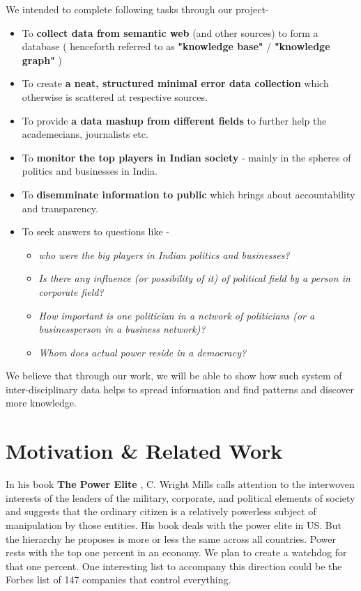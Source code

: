 We intended to complete following tasks through our project-
\begin{itemize}

    \item To \textbf{collect data from semantic web} (and other sources) to form a database ( henceforth referred to as \textbf{"knowledge base"} / \textbf{"knowledge graph"} )
    \item To create \textbf{ a neat, structured minimal error data collection } which otherwise is scattered at respective sources.
    \item To provide \textbf{ a data mashup from different fields } to further help the academecians, journalists etc.
    \item To \textbf{ monitor the top players in Indian society } - mainly in the spheres of politics and businesses in India.
    \item To \textbf{ disemminate information to public }  which brings about accountability and transparency. 
    \item  To seek answers to questions like -
        \begin{itemize}
         \item \emph{ who were the big players in Indian politics and businesses? }
         \item \emph{ Is there any influence (or possibility of it) of political field by a person in corporate field? }
         \item \emph{ How important is one politician in a network of politicians (or a businessperson in a business network)? }
         \item \emph{ Whom does actual power reside in a democracy? }
        \end{itemize}
\end{itemize}
We believe that through our work, we will be able to show how such system of inter-disciplinary data helps to spread information and find patterns and discover more knowledge.

\section{Motivation \& Related Work}

In his book \textbf{The Power Elite} \cite{Mills}, C. Wright Mills calls attention to the interwoven interests of the leaders of the military, corporate, and political elements of society and suggests that the ordinary citizen is a relatively powerless subject of manipulation by those entities. His book deals with the power elite in US. But the hierarchy he proposes is more or less the same across all countries. Power rests with the top one percent in an economy. We plan to create a watchdog for that one percent. One interesting list to accompany this direction could be the Forbes list \cite{FORBES} of 147 companies that control everything. 

